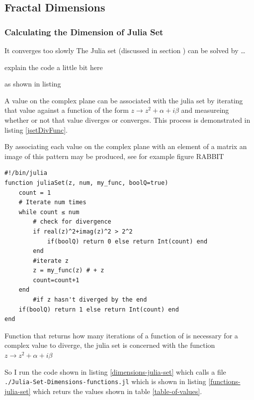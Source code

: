 \documentclass[11pt]{article}
\begin{document}
\subsection{Fractal Dimensions}
\label{sec:orge834686}
\subsubsection{Calculating the Dimension of Julia Set}
\label{sec:orge3852f0}
It converges too slowly
The Julia set (discussed in section ) can be solved by \ldots{}

explain the code a little bit here

as shown in listing

A value on the complex plane can be associated with the julia set by iterating
that value against a function of the form \(z \rightarrow z^{2} + \alpha + i
\beta\) and measureing whether or not that value diverges or converges. This process is demonstrated in listing \ref{jsetDivFunc}.

By associating each value on the complex plane with an element of a matrix an image of this pattern may be produced, see for example figure RABBIT

\begin{listing}[htbp]
\begin{verbatim}
#!/bin/julia
function juliaSet(z, num, my_func, boolQ=true)
    count = 1
    # Iterate num times
    while count ≤ num
        # check for divergence
        if real(z)^2+imag(z)^2 > 2^2
            if(boolQ) return 0 else return Int(count) end
        end
        #iterate z
        z = my_func(z) # + z
        count=count+1
    end
        #if z hasn't diverged by the end
    if(boolQ) return 1 else return Int(count) end
end
\end{verbatim}
\caption{\label{jsetDivFunc}Function that returns how many iterations of a function of is necessary for a complex value to diverge, the julia set is concerned with the function \(z \rightarrow z^{2} + \alpha + i \beta\)}
\end{listing}


So I run the code shown in listing \ref{dimensions-julia-set} which calls a file \texttt{./Julia-Set-Dimensions-functions.jl} which is shown in listing \ref{functions-julia-set} which returs the values shown in table \ref{table-of-values}.
\end{document}
